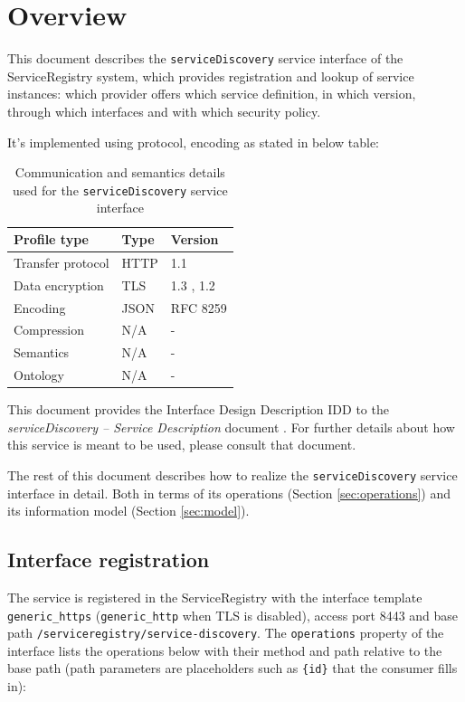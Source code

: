\documentclass[a4paper]{arrowhead}
\begin{document}
\section{Overview}
\label{sec:overview}

This document describes the \texttt{serviceDiscovery} service interface of the ServiceRegistry system, which provides registration and lookup of service instances: which provider offers which service definition, in which version, through which interfaces and with which security policy.

It's implemented using protocol, encoding as stated in below table:
\begin{table}[ht!]
  \centering
  \begin{tabular}{|l|l|l|}
    \hline
    \rowcolor{gray!33} Profile type & Type & Version \\ \hline
    Transfer protocol & HTTP & 1.1 \cite{rfc9112} \\ \hline
    Data encryption & TLS & 1.3 \cite{rfc8446}, 1.2 \cite{rfc5246} \\ \hline
    Encoding & JSON & RFC 8259 \cite{rfc8259} \\ \hline
    Compression & N/A & - \\ \hline
    Semantics & N/A & - \\ \hline
    Ontology & N/A & - \\ \hline
  \end{tabular}
  \caption{Communication and semantics details used for the \texttt{serviceDiscovery} service interface}
  \label{tab:comunication_semantics_profile}
\end{table}

This document provides the Interface Design Description IDD to the \textit{serviceDiscovery -- Service Description} document \cite{sr-serviceDiscovery-sd}.
For further details about how this service is meant to be used, please consult that document.

The rest of this document describes how to realize the \texttt{serviceDiscovery} service
interface in detail. Both in terms of its operations (Section \ref{sec:operations}) and its information model (Section \ref{sec:model}).

\subsection{Interface registration}

The service is registered in the ServiceRegistry with the interface template \texttt{generic\_\allowbreak{}https} (\texttt{generic\_\allowbreak{}http} when TLS is disabled), access port 8443 and base path \texttt{/\allowbreak{}serviceregistry/\allowbreak{}service-\allowbreak{}discovery}. The \texttt{operations} property of the interface lists the operations below with their method and path relative to the base path (path parameters are placeholders such as \texttt{\{id\}} that the consumer fills in):
\end{document}
